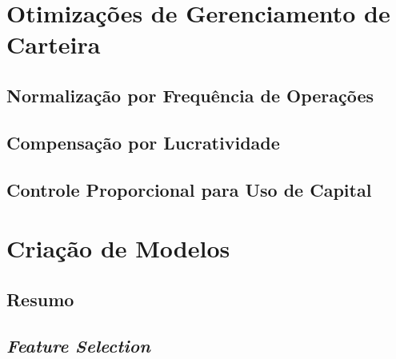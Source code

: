 \section{Otimizações de Gerenciamento de Carteira}

\subsection{Normalização por Frequência de Operações}
\label{freq_norm}
\paragraph{}

\subsection{Compensação por Lucratividade}
\label{profit_comp}
\paragraph{}

\subsection{Controle Proporcional para Uso de Capital}
\label{dynamic_rcc}
\paragraph{}




\section{Criação de Modelos}

\subsection{Resumo}
\paragraph{}

\subsection{\textit{Feature Selection}}
\paragraph{}

